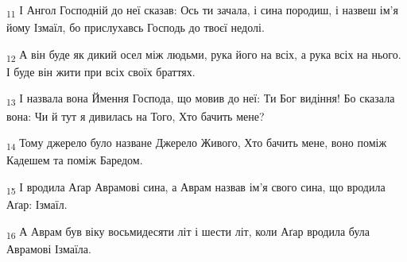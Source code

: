 \begin{tcolorbox}
\textsubscript{11} І Ангол Господній до неї сказав: Ось ти зачала, і сина породиш, і назвеш ім'я йому Ізмаїл, бо прислухавсь Господь до твоєї недолі.
\end{tcolorbox}
\begin{tcolorbox}
\textsubscript{12} А він буде як дикий осел між людьми, рука його на всіх, а рука всіх на нього. І буде він жити при всіх своїх браттях.
\end{tcolorbox}
\begin{tcolorbox}
\textsubscript{13} І назвала вона Ймення Господа, що мовив до неї: Ти Бог видіння! Бо сказала вона: Чи й тут я дивилась на Того, Хто бачить мене?
\end{tcolorbox}
\begin{tcolorbox}
\textsubscript{14} Тому джерело було назване Джерело Живого, Хто бачить мене, воно поміж Кадешем та поміж Баредом.
\end{tcolorbox}
\begin{tcolorbox}
\textsubscript{15} І вродила Аґар Аврамові сина, а Аврам назвав ім'я свого сина, що вродила Аґар: Ізмаїл.
\end{tcolorbox}
\begin{tcolorbox}
\textsubscript{16} А Аврам був віку восьмидесяти літ і шести літ, коли Аґар вродила була Аврамові Ізмаїла.
\end{tcolorbox}
